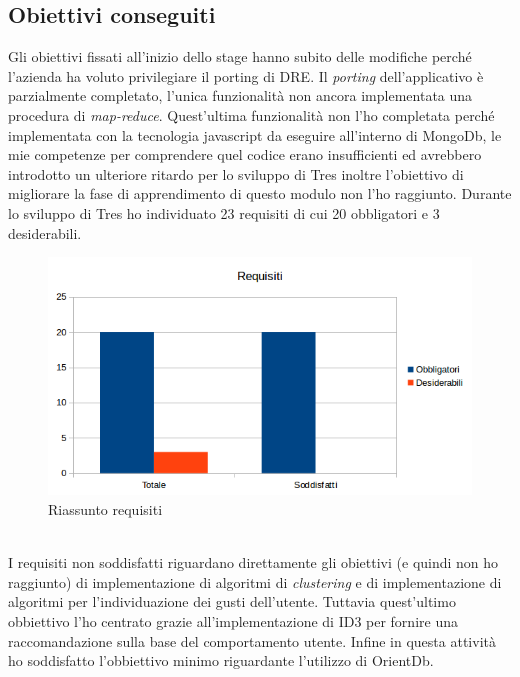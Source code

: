 \subsection{Obiettivi conseguiti}
Gli obiettivi fissati all'inizio dello stage hanno subito delle modifiche perché l'azienda ha voluto privilegiare il porting di DRE. Il \emph{porting} dell'applicativo è parzialmente completato, l'unica funzionalità non ancora implementata una procedura di \emph{map-reduce}. Quest'ultima funzionalità non l'ho completata perché implementata con la tecnologia javascript da eseguire all'interno di MongoDb, le mie competenze per comprendere quel codice erano insufficienti ed avrebbero introdotto un ulteriore ritardo per lo sviluppo di Tres inoltre l'obiettivo di migliorare la fase di apprendimento di questo modulo non l'ho raggiunto. Durante lo sviluppo di Tres ho individuato 23 requisiti di cui 20 obbligatori e 3 desiderabili.  
\begin{figure}[h]
\centering
\includegraphics[scale=0.62]{immagini/graficorequisiti}
\caption{Riassunto requisiti}
\label{fig:client-server}
\end{figure}
\\I requisiti non soddisfatti riguardano direttamente gli obiettivi (e quindi non ho raggiunto) di implementazione di algoritmi di \emph{clustering} e di implementazione di algoritmi per l'individuazione dei gusti dell'utente. Tuttavia quest'ultimo obbiettivo l'ho centrato grazie all'implementazione di ID3 per fornire una raccomandazione sulla base del comportamento utente. Infine in questa attività ho soddisfatto l'obbiettivo minimo riguardante l'utilizzo di OrientDb.
